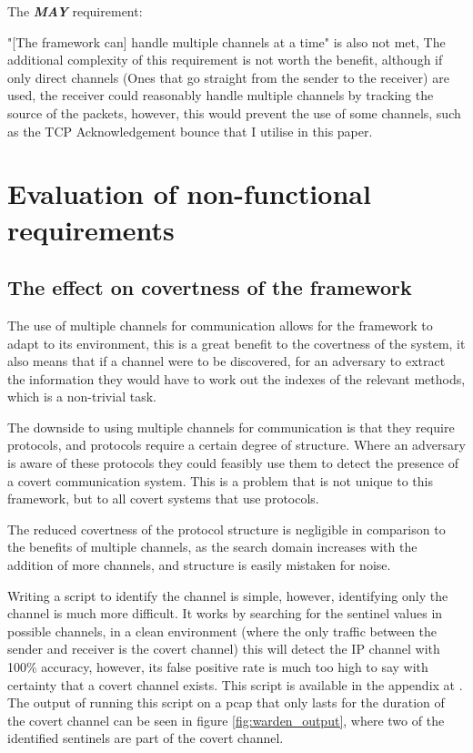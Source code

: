 The \textit{\textbf{MAY}} requirement:

"[The framework can] handle multiple channels at a time" is also not met, The additional complexity of this requirement is not worth the benefit, although if only direct channels (Ones that go straight from the sender to the receiver) are used, the receiver could reasonably handle multiple channels by tracking the source of the packets, however, this would prevent the use of some channels, such as the TCP Acknowledgement bounce that I utilise in this paper.

\section{Evaluation of non-functional requirements}

\subsection{The effect on covertness of the framework}

The use of multiple channels for communication allows for the framework to adapt to its environment, this is a great benefit to the covertness of the system, it also means that if a channel were to be discovered, for an adversary to extract the information they would have to work out the indexes of the relevant methods, which is a non-trivial task. 

The downside to using multiple channels for communication is that they require protocols, and protocols require a certain degree of structure. Where an adversary is aware of these protocols they could feasibly use them to detect the presence of a covert communication system. This is a problem that is not unique to this framework, but to all covert systems that use protocols.

The reduced covertness of the protocol structure is negligible in comparison to the benefits of multiple channels, as the search domain increases with the addition of more channels, and structure is easily mistaken for noise.

Writing a script to identify the channel is simple, however, identifying only the channel is much more difficult. It works by searching for the sentinel values in possible channels, in a clean environment (where the only traffic between the sender and receiver is the covert channel) this will detect the IP channel with 100\% accuracy, however, its false positive rate is much too high to say with certainty that a covert channel exists. This script is available in the appendix at . The output of running this script on a pcap that only lasts for the duration of the covert channel can be seen in figure \ref{fig:warden_output}, where two of the identified sentinels are part of the covert channel.

